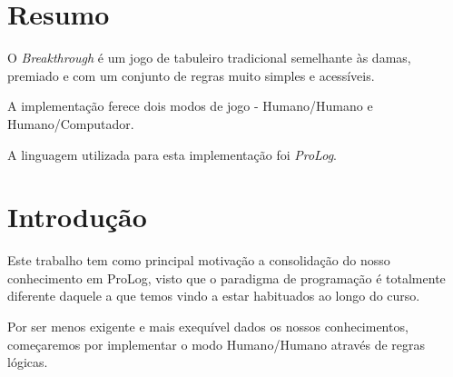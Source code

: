 \documentclass[15pt,a4paper]{article}
\begin{document}


\section*{Resumo}




O \textit{Breakthrough} é um jogo de tabuleiro tradicional semelhante às damas, premiado e com um conjunto de regras muito simples e acessíveis.

A implementação ferece dois modos de jogo - Humano/Humano e Humano/Computador.

A linguagem utilizada para esta implementação foi \textit{ProLog}.

\tableofcontents


\newpage


\section{Introdução}




Este trabalho tem como principal motivação a consolidação do nosso conhecimento em ProLog, visto que o paradigma de programação é totalmente diferente daquele a que temos vindo a estar habituados ao longo do curso.

Por ser menos exigente e mais exequível dados os nossos conhecimentos, começaremos por implementar o modo Humano/Humano através de regras lógicas.
\end{document}
